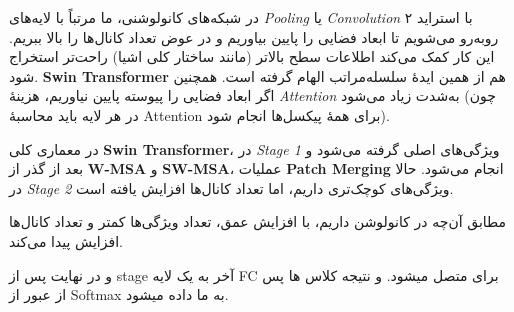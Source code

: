 در شبکه‌های کانولوشنی، ما مرتباً با لایه‌های \textit{Pooling} یا \textit{Convolution} 
با استراید ۲ روبه‌رو می‌شویم تا ابعاد فضایی را پایین بیاوریم و در عوض تعداد کانال‌ها را بالا ببریم. 
این کار کمک می‌کند اطلاعات سطح بالاتر (مانند ساختار کلی اشیا) راحت‌تر استخراج شود. 
\textbf{Swin Transformer} هم از همین ایدهٔ سلسله‌مراتب الهام گرفته است. 
همچنین اگر ابعاد فضایی را پیوسته پایین نیاوریم، هزینهٔ \textit{Attention} به‌شدت زیاد می‌شود 
(چون در هر لایه باید محاسبهٔ Attention برای همهٔ پیکسل‌ها انجام شود).

در معماری کلی \textbf{Swin Transformer}، در \textit{Stage 1} ویژگی‌های اصلی گرفته می‌شود 
و بعد از گذر از \textbf{W-MSA} و \textbf{SW-MSA}، عملیات \textbf{Patch Merging} انجام می‌شود. 
حالا در \textit{Stage 2} ویژگی‌های کوچک‌تری داریم، اما تعداد کانال‌ها افزایش یافته است. 

مطابق آن‌چه در کانولوشن داریم، با افزایش عمق، تعداد ویژگی‌ها کمتر و تعداد کانال‌ها افزایش پیدا می‌کند.


و در نهایت پس از stage  آخر به یک لایه FC  برای متصل میشود. و نتیجه کلاس ها پس از عبور از Softmax  به ما داده میشود.






